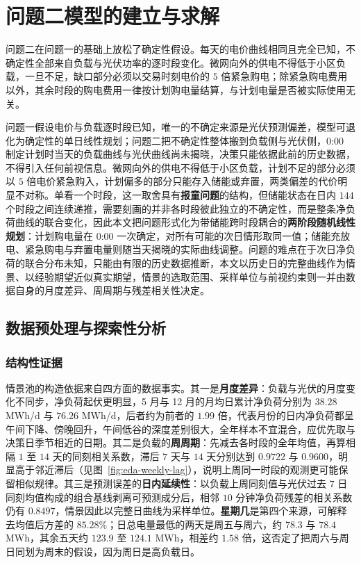 \section{问题二模型的建立与求解}

问题二在问题一的基础上放松了确定性假设。每天的电价曲线相同且完全已知，不确定性全部来自负载与光伏功率的逐时段变化。微网向外的供电不得低于小区负载，一旦不足，缺口部分必须以交易时刻电价的 $5$ 倍紧急购电；除紧急购电费用以外，其余时段的购电费用一律按计划购电量结算，与计划电量是否被实际使用无关。

问题一假设电价与负载逐时段已知，唯一的不确定来源是光伏预测偏差，模型可退化为确定性的单日线性规划；问题二把不确定性整体搬到负载侧与光伏侧，0:00 制定计划时当天的负载曲线与光伏曲线尚未揭晓，决策只能依据此前的历史数据，不得引入任何前视信息。微网向外的供电不得低于小区负载，计划不足的部分必须以 $5$ 倍电价紧急购入，计划偏多的部分只能存入储能或弃置，两类偏差的代价明显不对称。单看一个时段，这一取舍具有\textbf{报童问题}的结构，但储能状态在日内 $144$ 个时段之间连续递推，需要刻画的并非各时段彼此独立的不确定性，而是整条净负荷曲线的联合变化，因此本文把问题形式化为带储能跨时段耦合的\textbf{两阶段随机线性规划}：计划购电量在 0:00 一次确定，对所有可能的次日情形取同一值；储能充放电、紧急购电与弃置电量则随当天揭晓的实际曲线调整。问题的难点在于次日净负荷的联合分布未知，只能由有限的历史数据推断，本文以历史日的完整曲线作为情景、以经验期望近似真实期望，情景的选取范围、采样单位与前视约束则一并由数据自身的月度差异、周周期与残差相关性决定。

\subsection{数据预处理与探索性分析}

\subsubsection{结构性证据}

情景池的构造依据来自四方面的数据事实。其一是\textbf{月度差异}：负载与光伏的月度变化不同步，净负荷起伏更明显，5 月与 12 月的月均日累计净负荷分别为 $38.28$ MWh/d 与 $76.26$ MWh/d，后者约为前者的 $1.99$ 倍，代表月份的日内净负荷都呈午间下降、傍晚回升，午间低谷的深度差别很大，全年样本不宜混合，应优先取与决策日季节相近的日期。其二是负载的\textbf{周周期}：先减去各时段的全年均值，再算相隔 $1$ 至 $14$ 天的同刻相关系数，滞后 $7$ 天与 $14$ 天分别达到 $0.9722$ 与 $0.9600$，明显高于邻近滞后（见图~\ref{fig:eda-weekly-lag}），说明上周同一时段的观测更可能保留相似规律。其三是预测误差的\textbf{日内延续性}：以负载上周同刻值与光伏过去 $7$ 日同刻均值构成的组合基线剥离可预测成分后，相邻 $10$ 分钟净负荷残差的相关系数仍有 $0.8497$，情景因此以完整日曲线为采样单位。\textbf{星期几}是第四个来源，可解释去均值后方差的 $85.28\%$；日总电量最低的两天是周五与周六，约 $78.3$ 与 $78.4$ MWh，其余五天约 $123.9$ 至 $124.1$ MWh，相差约 $1.58$ 倍，这否定了把周六与周日同划为周末的假设，因为周日是高负载日。

